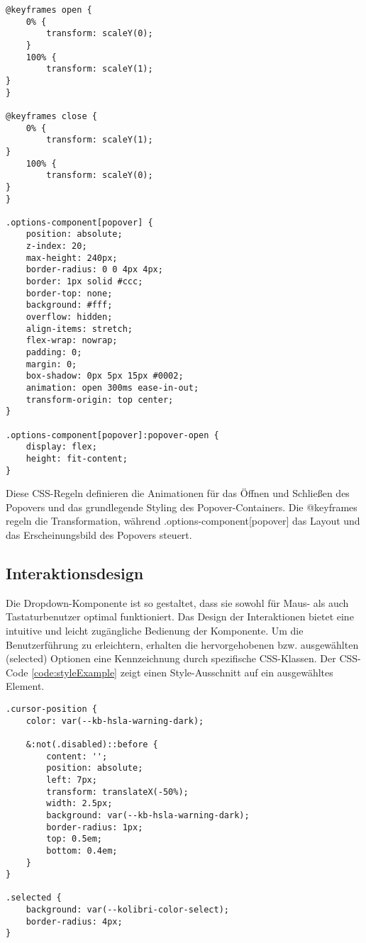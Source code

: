 
\begin{lstlisting}[style = htmlcssjs, caption = style.css der Demo-Page, label = code:styleDemoPage]
@keyframes open {
    0% {
        transform: scaleY(0);
    }
    100% {
        transform: scaleY(1);
}
}

@keyframes close {
    0% {
        transform: scaleY(1);
}
    100% {
        transform: scaleY(0);
}
}

.options-component[popover] {
    position: absolute;
    z-index: 20;
    max-height: 240px;
    border-radius: 0 0 4px 4px;
    border: 1px solid #ccc;
    border-top: none;
    background: #fff;
    overflow: hidden;
    align-items: stretch;
    flex-wrap: nowrap;
    padding: 0;
    margin: 0;
    box-shadow: 0px 5px 15px #0002;
    animation: open 300ms ease-in-out;
    transform-origin: top center;
}

.options-component[popover]:popover-open {
    display: flex;
    height: fit-content;
}
\end{lstlisting}

Diese CSS-Regeln definieren die Animationen für das Öffnen und Schließen des Popovers und das grundlegende Styling des Popover-Containers.
Die @keyframes regeln die Transformation, während .options-component[popover] das Layout und das Erscheinungsbild des Popovers steuert.

\subsection{Interaktionsdesign}
\label{sec:interactionDesign}

Die Dropdown-Komponente ist so gestaltet, dass sie sowohl für Maus- als auch Tastaturbenutzer optimal funktioniert. 
Das Design der Interaktionen bietet eine intuitive und leicht zugängliche Bedienung der Komponente.
Um die Benutzerführung zu erleichtern, erhalten die hervorgehobenen bzw. ausgewählten (selected) Optionen eine Kennzeichnung durch spezifische CSS-Klassen.
Der CSS-Code \ref{code:styleExample} zeigt einen Style-Ausschnitt auf ein ausgewähltes Element.

\begin{lstlisting}[style = htmlcssjs, caption = (cursor-position) und ausgewählten (selected) Optionen]
.cursor-position {
    color: var(--kb-hsla-warning-dark);

    &:not(.disabled)::before {
        content: '';
        position: absolute;
        left: 7px;
        transform: translateX(-50%);
        width: 2.5px;
        background: var(--kb-hsla-warning-dark);
        border-radius: 1px;
        top: 0.5em;
        bottom: 0.4em;
    }
}

.selected {
    background: var(--kolibri-color-select);
    border-radius: 4px;
}
\end{lstlisting}

